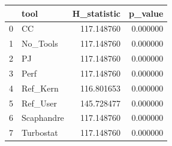 \begin{tabular}{llrr}
\toprule
 & tool & H_statistic & p_value \\
\midrule
0 & CC & 117.148760 & 0.000000 \\
1 & No_Tools & 117.148760 & 0.000000 \\
2 & PJ & 117.148760 & 0.000000 \\
3 & Perf & 117.148760 & 0.000000 \\
4 & Ref_Kern & 116.801653 & 0.000000 \\
5 & Ref_User & 145.728477 & 0.000000 \\
6 & Scaphandre & 117.148760 & 0.000000 \\
7 & Turbostat & 117.148760 & 0.000000 \\
\bottomrule
\end{tabular}
